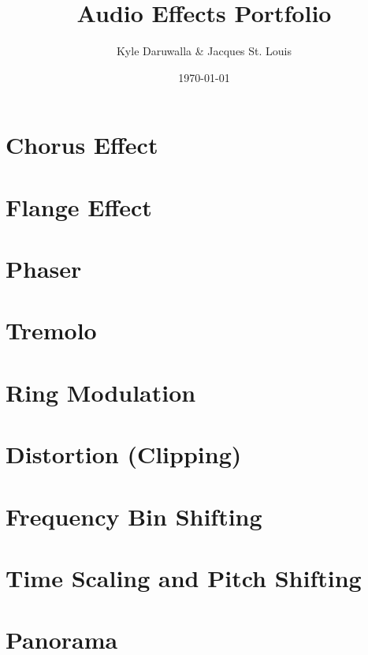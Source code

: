 \documentclass{article}
\title{Audio Effects Portfolio}
\author{Kyle Daruwalla \& Jacques St. Louis}
\date{\today}
\begin{document}
\maketitle

\section{Chorus Effect}


\newpage

\section{Flange Effect}


\newpage

\section{Phaser}


\newpage

\section{Tremolo}


\newpage

\section{Ring Modulation}


\newpage

\section{Distortion (Clipping)}


\newpage

\section{Frequency Bin Shifting}


\newpage

\section{Time Scaling and Pitch Shifting}


\newpage

\section{Panorama}

\end{document}
